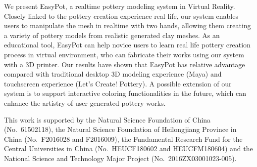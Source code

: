 \documentclass{svjour3}                     %
\begin{document}
We present EasyPot, a realtime pottery modeling system in Virtual Reality.
Closely linked to the pottery creation experience real life, our system enables users to manipulate the mesh in realtime with two hands, allowing them creating a variety of pottery models from realistic generated clay meshes.
As an educational tool, EasyPot can help novice users to learn real life pottery creation process in virtual environment, who can fabricate their works using our system with a 3D printer.
Our results have shown that EasyPot has relative advantage compared with traditional desktop 3D modeling experience (Maya) and touchscreen experience (Let's Create! Pottery).
A possible extension of our system is to support interactive coloring functionalities in the future, which can enhance the artistry of user generated pottery works.


\begin{acknowledgements}
This work is supported by the Natural Science Foundation of China (No.~61502118), the Natural Science Foundation of Heilongjiang Province in China (No.~F2016028 and F2016009), the Fundamental Research Fund for the Central Universities in China (No.~HEUCF180602 and HEUCFM180604) and the National Science and Technology Major Project (No.~2016ZX03001023-005).
\end{acknowledgements}


%
%
\end{document}
